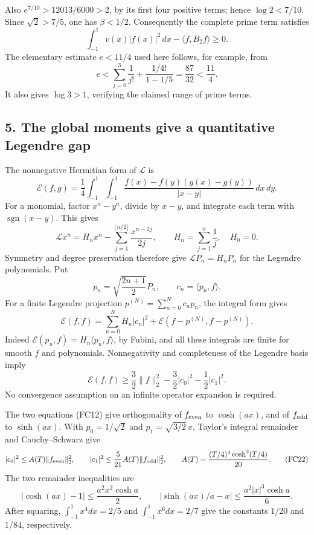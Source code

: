 \documentclass[
  10pt,
  a4paper,
]{article}
\begin{document}
Also \(e^{7/10}>12013/6000>2\), by its first four positive terms; hence
\(\log2<7/10\). Since \(\sqrt2>7/5\), one has \(\beta<1/2\).
Consequently the complete prime term satisfies \[
\boxed{\int_{-1}^1v(x)|f(x)|^2\,dx-\langle f,B_2f\rangle\ge0.}
\tag{FC19}
\] The elementary estimate \(e<11/4\) used here follows, for example,
from \[
e<\sum_{j=0}^3\frac1{j!}+
\frac{1/4!}{1-1/5}
=\frac{87}{32}<\frac{11}{4}.
\] It also gives \(\log3>1\), verifying the claimed range of prime
terms.

\subsection{5. The global moments give a quantitative Legendre
gap}\label{the-global-moments-give-a-quantitative-legendre-gap}

The nonnegative Hermitian form of \(\mathcal L\) is \[
\mathcal E(f,g)=\frac14\int_{-1}^1\int_{-1}^1
\frac{\overline{f(x)-f(y)}(g(x)-g(y))}{|x-y|}\,dx\,dy.
\] For a monomial, factor \(x^n-y^n\), divide by \(x-y\), and integrate
each term with \(\operatorname{sgn}(x-y)\). This gives \[
\mathcal Lx^n=H_nx^n-
\sum_{j=1}^{\lfloor n/2\rfloor}\frac{x^{n-2j}}{2j},
\qquad H_n=\sum_{j=1}^n\frac1j,\quad H_0=0.
\tag{FC20}
\] Symmetry and degree preservation therefore give
\(\mathcal LP_n=H_nP_n\) for the Legendre polynomials. Put \[
p_n=\sqrt{\frac{2n+1}{2}}P_n,\qquad
c_n=\langle p_n,f\rangle.
\] For a finite Legendre projection \(p^{(N)}=\sum_{n=0}^Nc_np_n\), the
integral form gives \[
\mathcal E(f,f)=
\sum_{n=0}^NH_n|c_n|^2+
\mathcal E(f-p^{(N)},f-p^{(N)}).
\] Indeed \(\mathcal E(p_n,f)=H_n\langle p_n,f\rangle\), by Fubini, and
all these integrals are finite for smooth \(f\) and polynomials.
Nonnegativity and completeness of the Legendre basis imply \[
\mathcal E(f,f)\ge
\frac32\|f\|_2^2-\frac32|c_0|^2-\frac12|c_1|^2.
\tag{FC21}
\] No convergence assumption on an infinite operator expansion is
required.

The two equations (FC12) give orthogonality of \(f_{\rm even}\) to
\(\cosh(ax)\), and of \(f_{\rm odd}\) to \(\sinh(ax)\). With
\(p_0=1/\sqrt2\) and \(p_1=\sqrt{3/2}\,x\), Taylor's integral remainder
and Cauchy--Schwarz give \[
|c_0|^2\le A(T)\|f_{\rm even}\|_2^2,\qquad
|c_1|^2\le\frac5{21}A(T)\|f_{\rm odd}\|_2^2,\qquad
A(T)=\frac{(T/4)^4\cosh^2(T/4)}{20}.
\tag{FC22}
\] The two remainder inequalities are \[
|\cosh(ax)-1|\le\frac{a^2x^2\cosh a}{2},\qquad
|\sinh(ax)/a-x|\le\frac{a^2|x|^3\cosh a}{6}.
\] After squaring, \(\int_{-1}^1x^4dx=2/5\) and \(\int_{-1}^1x^6dx=2/7\)
give the constants \(1/20\) and \(1/84\), respectively.
\end{document}
